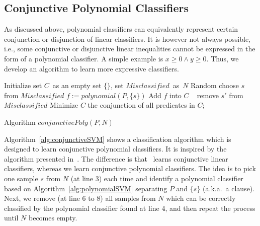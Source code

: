 
\subsection{Conjunctive Polynomial Classifiers}
As discussed above, polynomial classifiers can equivalently represent certain conjunction or disjunction of linear classifiers. It is however not always possible, i.e., some conjunctive or disjunctive linear inequalities cannot be expressed in the form of a polynomial classifier. A simple example is $\mathit{x \ge 0 \land y \ge 0}$. Thus, we develop an algorithm to learn more expressive classifiers.
\begin{algorithm}[!h]
\SetAlgoVlined
\Indm
\Indp
    Initialize set $C$\ as an empty set $\{\}$, set $\mathit{Misclassified}$\ as\ $N$\;
     {
        Random choose $s$ from $\mathit{Misclassified}$\;
        $f := \mathit{polynomial}(P, \{s\})$\;
        Add $f$ into $C$\;
         {\
             {
                remove $s'$ from $\mathit{Misclassified}$\;
            }
        }
    }
    Minimize $C$\;
    \Return the conjunction of all predicates in $C$;
\caption{Algorithm $\mathit{conjunctivePoly}(P, N)$}
\label{alg:conjunctiveSVM}
\end{algorithm}
Algorithm~\ref{alg:conjunctiveSVM} shows a classification algorithm which is designed to learn conjunctive polynomial classifiers.
It is inspired by the algorithm presented in~\cite{sharma2012interpolants}. The difference is that~\cite{sharma2012interpolants} learns conjunctive linear classifiers, whereas we learn conjunctive polynomial classifiers. The idea is to pick one sample $s$ from $N$ (at line 3) each time and identify a polynomial classifier based on Algorithm~\ref{alg:polynomialSVM} separating $P$ and $\{s\}$ (a.k.a.~a clause). Next, we remove (at line 6 to 8) all samples from $N$ which can be correctly classified by the polynomial classifier found at line 4, and then repeat the process until $N$ becomes empty.
